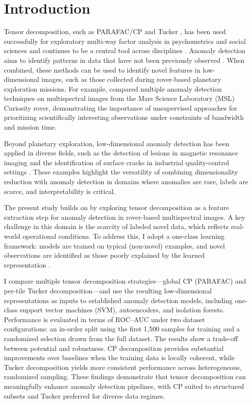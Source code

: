 \documentclass[pdflatex,sn-mathphys-ay]{sn-jnl}
\begin{document}
\section{Introduction}
Tensor decomposition, such as PARAFAC/CP \citep{Harshman1970} and Tucker \citep{Tucker1966}, has been used successfully for exploratory multi-way factor analysis in psychometrics and social sciences and continues to be a central tool across disciplines \citep{KoldaBader2009}. Anomaly detection aims to identify patterns in data that have not been previously observed \citep{Markou2003a,Markou2003b,Chandola2009,Pimentel2014}. When combined, these methods can be used to identify novel features in low-dimensional images, such as those collected during rover-based planetary exploration missions. For example, \citep{Kerner2020} compared multiple anomaly detection techniques on multispectral images from the Mars Science Laboratory (MSL) Curiosity rover, demonstrating the importance of unsupervised approaches for prioritizing scientifically interesting observations under constraints of bandwidth and mission time.

Beyond planetary exploration, low-dimensional anomaly detection has been applied in diverse fields, such as the detection of lesions in magnetic resonance imaging \citep{Kim2021} and the identification of surface cracks in industrial quality-control settings \citep{Tabernik2019}. These examples highlight the versatility of combining dimensionality reduction with anomaly detection in domains where anomalies are rare, labels are scarce, and interpretability is critical.

The present study builds on \citet{Kerner2020} by exploring tensor decomposition as a feature extraction step for anomaly detection in rover-based multispectral images. A key challenge in this domain is the scarcity of labeled novel data, which reflects real-world operational conditions. To address this, I adopt a one-class learning framework: models are trained on typical (non-novel) examples, and novel observations are identified as those poorly explained by the learned representation \citep{Pimentel2014}. 

I compare multiple tensor decomposition strategies—global CP (PARAFAC) and per-tile Tucker decomposition—and use the resulting low-dimensional representations as inputs to established anomaly detection models, including one-class support vector machines (SVM), autoencoders, and isolation forests. Performance is evaluated in terms of ROC–AUC under two dataset configurations: an in-order split using the first 1,500 samples for training and a randomized selection drawn from the full dataset. The results show a trade-off between potential and robustness. CP decomposition provides substantial improvements over baselines when the training data is locally coherent, while Tucker decomposition yields more consistent performance across heterogeneous, randomized sampling. These findings demonstrate that tensor decomposition can meaningfully enhance anomaly detection pipelines, with CP suited to structured subsets and Tucker preferred for diverse data regimes.
\end{document}
